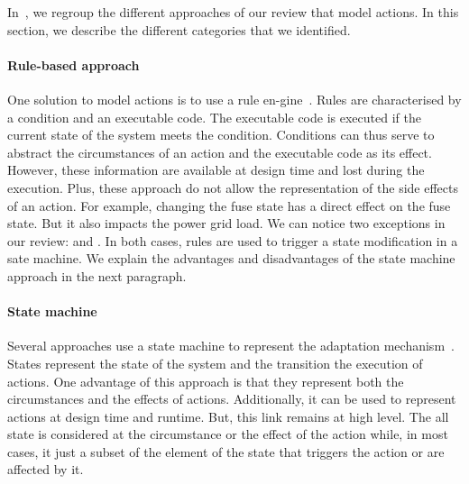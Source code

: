 In~, we regroup the different approaches of our review that model \glspl{action}.
In this section, we describe the different categories that we identified.

\paragraph{Rule-based approach}
One solution to model \glspl{action} is to use a rule en-\linebreak gine~\cite{DBLP:conf/icse/TaharaOH17, DBLP:conf/icse/ArcainiRS15, DBLP:conf/wrla/BruniCGLV12, DBLP:conf/eurosys/GraceHPBCT08, DBLP:conf/gpce/PintoFT03, DBLP:journals/computer/GarlanCHSS04}.
Rules are characterised by a condition and an executable code.
The executable code is executed if the current state of the system meets the condition.
Conditions can thus serve to abstract the \Glspl{circumstance} of an action and the executable code as its effect.
However, these information are available at design time and lost during the execution.
Plus, these approach do not allow the representation of the side effects of an action.
For example, changing the fuse state has a direct effect on the fuse state.
But it also impacts the power grid load.
We can notice two exceptions in our review: \cite{DBLP:conf/icse/TaharaOH17} and \cite{DBLP:conf/icse/ArcainiRS15}.
In both cases, rules are used to trigger a state modification in a sate machine.
We explain the advantages and disadvantages of the state machine approach in the next paragraph. 



\paragraph{State machine}
Several approaches use a state machine to represent the adaptation mechanism~\cite{DBLP:conf/icse/ArcainiRS15, DBLP:conf/icse/IftikharW14a, DBLP:conf/smartgridsec/0001FKNT14, DBLP:conf/sigsoft/MorenoCGS15, DBLP:conf/kbse/FilieriGLM11, DBLP:conf/wetice/DjoudiBZ14, DBLP:conf/aosd/ZhangGC09, DBLP:conf/icse/GhezziPST13, DBLP:conf/kbse/TajalliGEM10}.
States represent the state of the system and the transition the execution of \glspl{action}. 
One advantage of this approach is that they represent both the \glspl{circumstance} and the effects of actions.
Additionally, it can be used to represent actions at design time and runtime.
But, this link remains at high level.
The all state is considered at the circumstance or the effect of the action while, in most cases, it just a subset of the element of the state that triggers the action or are affected by it. 

